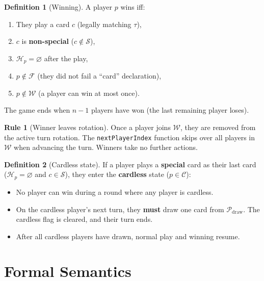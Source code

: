 \documentclass[11pt,a4paper,twoside]{article}
\theoremstyle{definition}
\newtheorem{definition}{Definition}[section]
\newtheorem{rule}{Rule}[section]
\theoremstyle{remark}
\newcommand{\Hand}{\ensuremath{\mathcal{H}}}
\newcommand{\Pile}{\ensuremath{\mathcal{P}}}
\newcommand{\Top}{\ensuremath{\tau}}
\newcommand{\Winner}{\ensuremath{\mathcal{W}}}
\newcommand{\Cardless}{\ensuremath{\mathcal{C}}}
\newcommand{\Failed}{\ensuremath{\mathcal{F}}}
\newcommand{\Special}{\ensuremath{\mathcal{S}}}
\begin{document}
\begin{definition}[Winning]
  A player $p$ wins iff:
  \begin{enumerate}[nosep, label=(\roman*)]
    \item They play a card $c$ (legally matching $\Top$),
    \item $c$ is \textbf{non-special} ($c \notin \Special$),
    \item $\Hand_p = \varnothing$ after the play,
    \item $p \notin \Failed$ (they did not fail a ``card'' declaration),
    \item $p \notin \Winner$ (a player can win at most once).
  \end{enumerate}
  The game ends when $n-1$ players have won (the last remaining player loses).
\end{definition}

\begin{rule}[Winner leaves rotation]
  Once a player joins $\Winner$, they are removed from the active turn
  rotation. The \texttt{nextPlayerIndex} function skips over all players
  in $\Winner$ when advancing the turn. Winners take no further actions.
\end{rule}

\begin{definition}[Cardless state]
  \label{sec:cardless}
  If a player plays a \textbf{special} card as their last card
  ($\Hand_p = \varnothing$ and $c \in \Special$), they enter the
  \textbf{cardless} state ($p \in \Cardless$):
  \begin{itemize}[nosep]
    \item No player can win during a round where any player is cardless.
    \item On the cardless player's next turn, they \textbf{must} draw one
          card from $\Pile_{\text{draw}}$. The cardless flag is cleared, and
          their turn ends.
    \item After all cardless players have drawn, normal play and winning
          resume.
  \end{itemize}
\end{definition}

\section{Formal Semantics}
\label{sec:formal}
\end{document}

